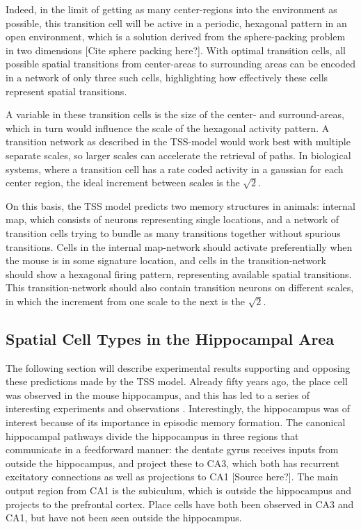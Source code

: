 \documentclass{article}
\begin{document}
    Indeed, in the limit of getting as many center-regions into the environment as possible, this transition cell will be active in a periodic, hexagonal pattern in an open environment, which is a solution derived from the sphere-packing problem in two dimensions \parencite{Waniek2018} [Cite sphere packing here?]. With optimal transition cells, all possible spatial transitions from center-areas to surrounding areas can be encoded in a network of only three such cells, highlighting how effectively these cells represent spatial transitions.

    A variable in these transition cells is the size of the center- and surround-areas, which in turn would influence the scale of the hexagonal activity pattern. A transition network as described in the TSS-model would work best with multiple separate scales, so larger scales can accelerate the retrieval of paths. In biological systems, where a transition cell has a rate coded activity in a gaussian for each center region, the ideal increment between scales is the \(\sqrt{2}\).

    On this basis, the TSS model predicts two memory structures in animals:  internal map, which consists of neurons representing single locations, and a network of transition cells trying to bundle as many transitions together without spurious transitions. Cells in the internal map-network should activate preferentially when the mouse is in some signature location, and cells in the transition-network should show a hexagonal firing pattern, representing available spatial transitions. This transition-network should also contain transition neurons on different scales, in which the increment from one scale to the next is the \(\sqrt{2}\).
    
    \subsection{Spatial Cell Types in the Hippocampal Area}
    The following section will describe experimental results supporting and opposing these predictions made by the TSS model.
    Already fifty years ago, the place cell was observed in the mouse hippocampus, and this has led to a series of interesting experiments and observations \parencite{OKeefe1971,OKeefe1976}. Interestingly, the hippocampus was of interest because of its importance in episodic memory formation. The canonical hippocampal pathways divide the hippocampus in three regions that communicate in a feedforward manner: the dentate gyrus receives inputs from outside the hippocampus, and project these to CA3, which both has recurrent excitatory connections as well as projections to CA1 [Source here?]. The main output region from CA1 is the subiculum, which is outside the hippocampus and projects to the prefrontal cortex. Place cells have both been observed in CA3 and CA1, but have not been seen outside the hippocampus.
\end{document}
